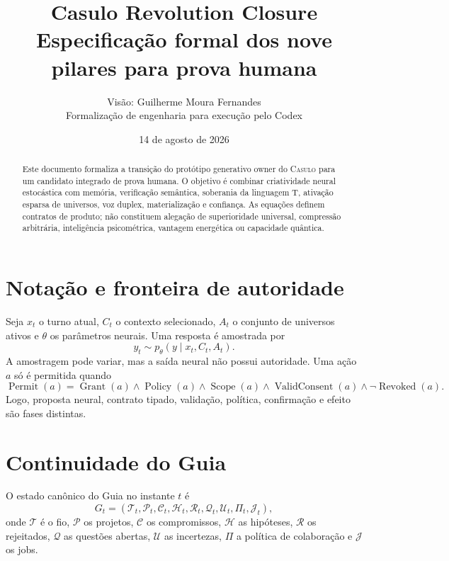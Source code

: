 \documentclass[10pt,a4paper]{article}
\title{\textbf{Casulo Revolution Closure}\\
\large Especificação formal dos nove pilares para prova humana}
\author{Visão: Guilherme Moura Fernandes\\Formalização de engenharia para execução pelo Codex}
\date{14 de agosto de 2026}
\newcommand{\Casulo}{\textsc{Casulo}}
\newcommand{\Tlang}{\textsf{T}}
\begin{document}
\maketitle

\begin{abstract}
Este documento formaliza a transição do protótipo generativo owner do \Casulo
para um candidato integrado de prova humana. O objetivo é combinar criatividade
neural estocástica com memória, verificação semântica, soberania da linguagem
\Tlang, ativação esparsa de universos, voz duplex, materialização e confiança.
As equações definem contratos de produto; não constituem alegação de
superioridade universal, compressão arbitrária, inteligência psicométrica,
vantagem energética ou capacidade quântica.
\end{abstract}

{\small\tableofcontents}
\newpage

\section{Notação e fronteira de autoridade}

Seja $x_t$ o turno atual, $C_t$ o contexto selecionado, $A_t$ o conjunto de
universos ativos e $\theta$ os parâmetros neurais. Uma resposta é amostrada por
\begin{equation}
y_t \sim p_\theta(y\mid x_t,C_t,A_t).
\end{equation}
A amostragem pode variar, mas a saída neural não possui autoridade. Uma ação
$a$ só é permitida quando
\begin{equation}
\operatorname{Permit}(a)=
\operatorname{Grant}(a)\land
\operatorname{Policy}(a)\land
\operatorname{Scope}(a)\land
\operatorname{ValidConsent}(a)\land
\neg\operatorname{Revoked}(a).
\end{equation}
Logo, proposta neural, contrato tipado, validação, política, confirmação e
efeito são fases distintas.

\section{Continuidade do Guia}

O estado canônico do Guia no instante $t$ é
\begin{equation}
G_t=(\mathcal T_t,\mathcal P_t,\mathcal C_t,\mathcal H_t,
\mathcal R_t,\mathcal Q_t,\mathcal U_t,\Pi_t,\mathcal J_t),
\end{equation}
onde $\mathcal T$ é o fio, $\mathcal P$ os projetos, $\mathcal C$ os
compromissos, $\mathcal H$ as hipóteses, $\mathcal R$ os rejeitados,
$\mathcal Q$ as questões abertas, $\mathcal U$ as incertezas, $\Pi$ a política
de colaboração e $\mathcal J$ os jobs.
\end{document}
